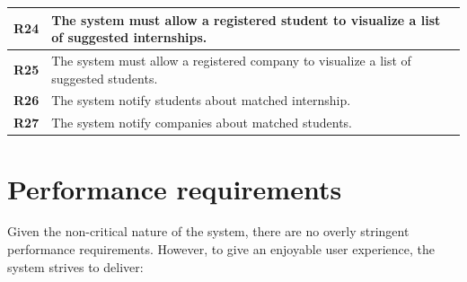 \begin{table}[H]
\begin{tabular}{|l|m{10cm}|}
        \hline \textbf{R24} & The system must allow a registered student to visualize a list of suggested internships. \\
        \hline \textbf{R25} & The system must allow a registered company to visualize a list of suggested students. \\
        \hline \textbf{R26} & The system notify students about matched internship. \\
        \hline \textbf{R27} & The system notify companies about matched students. \\
        \hline
    \end{tabular}
\end{table}


\section{Performance requirements}
Given the non-critical nature of the system, there are no overly stringent performance requirements. However, to give an enjoyable user experience, the system strives to deliver:
